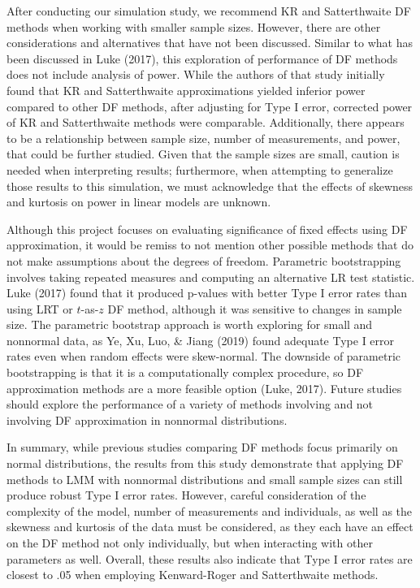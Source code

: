 \documentclass[12pt, twoside]{amherstthesis}
\begin{document}
After conducting our simulation study, we recommend KR and Satterthwaite DF methods when working with smaller sample sizes. However, there are other considerations and alternatives that have not been discussed. Similar to what has been discussed in Luke (2017), this exploration of performance of DF methods does not include analysis of power. While the authors of that study initially found that KR and Satterthwaite approximations yielded inferior power compared to other DF methods, after adjusting for Type I error, corrected power of KR and Satterthwaite methods were comparable. Additionally, there appears to be a relationship between sample size, number of measurements, and power, that could be further studied. Given that the sample sizes are small, caution is needed when interpreting results; furthermore, when attempting to generalize those results to this simulation, we must acknowledge that the effects of skewness and kurtosis on power in linear models are unknown.

Although this project focuses on evaluating significance of fixed effects using DF approximation, it would be remiss to not mention other possible methods that do not make assumptions about the degrees of freedom. Parametric bootstrapping involves taking repeated measures and computing an alternative LR test statistic. Luke (2017) found that it produced p-values with better Type I error rates than using LRT or \(t\)-as-\(z\) DF method, although it was sensitive to changes in sample size. The parametric bootstrap approach is worth exploring for small and nonnormal data, as Ye, Xu, Luo, \& Jiang (2019) found adequate Type I error rates even when random effects were skew-normal. The downside of parametric bootstrapping is that it is a computationally complex procedure, so DF approximation methods are a more feasible option (Luke, 2017). Future studies should explore the performance of a variety of methods involving and not involving DF approximation in nonnormal distributions.

In summary, while previous studies comparing DF methods focus primarily on normal distributions, the results from this study demonstrate that applying DF methods to LMM with nonnormal distributions and small sample sizes can still produce robust Type I error rates. However, careful consideration of the complexity of the model, number of measurements and individuals, as well as the skewness and kurtosis of the data must be considered, as they each have an effect on the DF method not only individually, but when interacting with other parameters as well. Overall, these results also indicate that Type I error rates are closest to .05 when employing Kenward-Roger and Satterthwaite methods.
\end{document}
